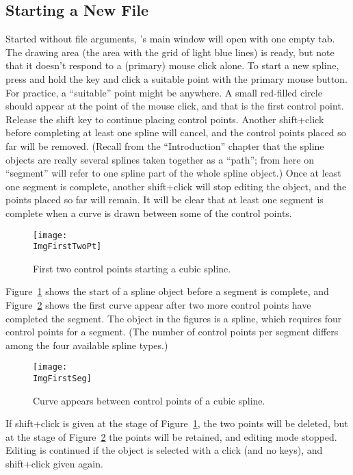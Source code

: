 		\subsection{Starting a New File}%
		Started without file arguments, \IXpkg{}'s
		main window will open with one empty tab.
		The drawing area (the area with the grid
		of light blue lines) is ready, but note that it
		doesn't respond to a (primary) mouse click alone. To start
		a new spline, press and hold the 
		key and click a suitable point with the primary
		mouse button. For practice, a ``suitable'' point
		might be anywhere. A small red-filled circle should
		appear at the point of the mouse click, and that is
		the first control point. Release the shift key to
		continue placing control points. Another shift+click
		before completing at least one spline 
		will cancel, and the control points placed so far will be
		removed. (Recall from the ``Introduction'' chapter
		that the spline objects are really several splines
		taken together as a ``path''; from here on ``segment''
		will refer to one spline part of the whole spline object.)
		Once at least one segment is complete, another
		shift+click will stop editing the object, and the points
		placed so far will remain.
		It will be clear that at least one segment is complete
		when a curve is drawn between some of the control points.
		
		\begin{figure}[htbp]
		\centering
		\texttt{[image: \\ImgFirstTwoPt]}
		\caption{First two control points starting a cubic spline.}
		\label{fig:first_two_points}
		\end{figure}
		
		Figure~\ref{fig:first_two_points} shows the start of a
		spline object before a segment is complete, and
		Figure~\ref{fig:first_curve_between} shows the first
		curve appear after two more control points have completed
		the segment. The object in the figures is a 
		spline, which requires four control points for a segment.
		(The number of control points per segment differs among the
		four available spline types.) 
		
		\begin{figure}[htbp]
		\centering
		\texttt{[image: \\ImgFirstSeg]}
		\caption{Curve appears between control points of a cubic spline.}
		\label{fig:first_curve_between}
		\end{figure}

		If shift+click is given at the stage of
		Figure~\ref{fig:first_two_points}, the two points will
		be deleted, but at the stage of
		Figure~\ref{fig:first_curve_between} the points will
		be retained, and editing mode stopped. Editing
		is continued if the object is selected with a click
		(and no keys), and shift+click given again.

